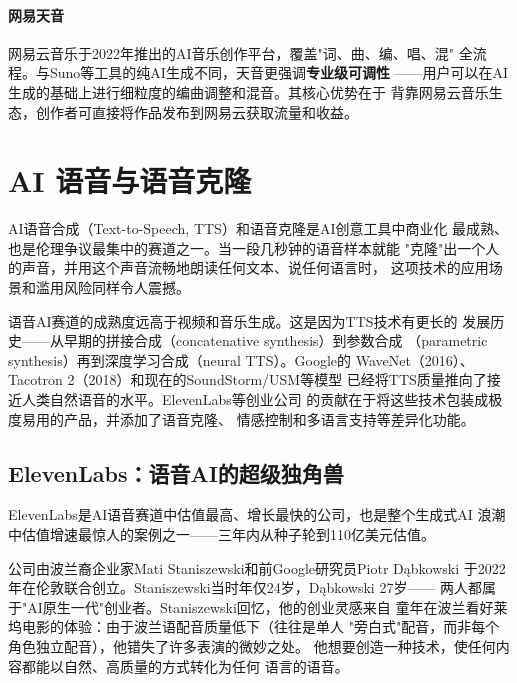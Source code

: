 \paragraph{网易天音}
网易云音乐于2022年推出的AI音乐创作平台，覆盖"词、曲、编、唱、混"
全流程。与Suno等工具的纯AI生成不同，天音更强调\textbf{专业级可调性}
——用户可以在AI生成的基础上进行细粒度的编曲调整和混音。其核心优势在于
背靠网易云音乐生态，创作者可直接将作品发布到网易云获取流量和收益。



\section{AI 语音与语音克隆}
\label{sec:create-voice}

AI语音合成（Text-to-Speech, TTS）和语音克隆是AI创意工具中商业化
最成熟、也是伦理争议最集中的赛道之一。当一段几秒钟的语音样本就能
"克隆"出一个人的声音，并用这个声音流畅地朗读任何文本、说任何语言时，
这项技术的应用场景和滥用风险同样令人震撼。

语音AI赛道的成熟度远高于视频和音乐生成。这是因为TTS技术有更长的
发展历史——从早期的拼接合成（concatenative synthesis）到参数合成
（parametric synthesis）再到深度学习合成（neural TTS）。Google的
WaveNet（2016）、Tacotron 2（2018）和现在的SoundStorm/USM等模型
已经将TTS质量推向了接近人类自然语音的水平。ElevenLabs等创业公司
的贡献在于将这些技术包装成极度易用的产品，并添加了语音克隆、
情感控制和多语言支持等差异化功能。

\subsection{ElevenLabs：语音AI的超级独角兽}
\label{subsec:elevenlabs}

ElevenLabs是AI语音赛道中估值最高、增长最快的公司，也是整个生成式AI
浪潮中估值增速最惊人的案例之一——三年内从种子轮到110亿美元估值。

公司由波兰裔企业家Mati Staniszewski和前Google研究员Piotr Dąbkowski
于2022年在伦敦联合创立。Staniszewski当时年仅24岁，Dąbkowski 27岁——
两人都属于"AI原生一代"创业者。Staniszewski回忆，他的创业灵感来自
童年在波兰看好莱坞电影的体验：由于波兰语配音质量低下（往往是单人
"旁白式"配音，而非每个角色独立配音），他错失了许多表演的微妙之处。
他想要创造一种技术，使任何内容都能以自然、高质量的方式转化为任何
语言的语音。

